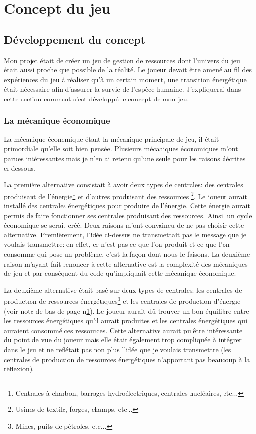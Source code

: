 \documentclass{article}
\begin{document}
        \section{Concept du jeu}
        \subsection{Développement du concept}
        
        Mon projet était de créer un jeu de gestion de ressources dont l'univers du jeu était aussi proche que possible de la réalité. Le joueur devait être amené au fil des expériences du jeu à réaliser qu'à un certain moment, une transition énergétique était nécessaire afin d'assurer la survie de l'espèce humaine. J'expliquerai dans cette section comment s'est développé le concept de mon jeu.
        
        \subsubsection{La mécanique économique}
        La mécanique économique étant la mécanique principale de jeu, il était primordiale qu'elle soit bien pensée.
        Plusieurs mécaniques économiques m'ont parues intéressantes mais je n'en ai retenu qu'une seule pour les raisons décrites ci-dessous.
        
        
        La première alternative consistait à avoir deux types de centrales: des centrales produisant de l'énergie\footnote{Centrales à charbon, barrages hydroélectriques, centrales nucléaires, etc...\label{energyPlant}} et d'autres produisant des ressources \footnote{Usines de textile, forges, champs, etc...}. Le joueur aurait installé des centrales énergétiques pour produire de l'énergie. Cette énergie aurait permis de faire fonctionner ses centrales produisant des ressources. Ainsi, un cycle économique se serait créé. 
        Deux raisons m'ont convaincu de ne pas choisir cette alternative. Premièrement, l'idée ci-dessus ne transmettait pas le message que je voulais transmettre: en effet, ce n'est pas ce que l'on produit et ce que l'on consomme qui pose un problème, c'est la façon dont nous le faisons. La deuxième raison m'ayant fait renoncer à cette alternative est la complexité des mécaniques de jeu et par conséquent du code qu'impliquait cette mécanique économique.
        
        
        La deuxième alternative était basé sur deux types de centrales: les centrales de production de ressources énergétiques\footnote{Mines, puits de pétroles, etc...} et les centrales de production d'énergie (voir note de bas de page n\degree\ref{energyPlant}). Le joueur aurait dû trouver un bon équilibre entre les ressources énergétiques qu'il aurait produites et les centrales énergétiques qui auraient consommé ces ressources.
        Cette alternative aurait pu être intéressante du point de vue du joueur mais elle était également trop compliquée à intégrer dans le jeu et ne reflétait pas non plus l'idée que je voulais transmettre (les centrales de production de ressources énergétiques n'apportant pas beaucoup à la réflexion).
        
\end{document}
